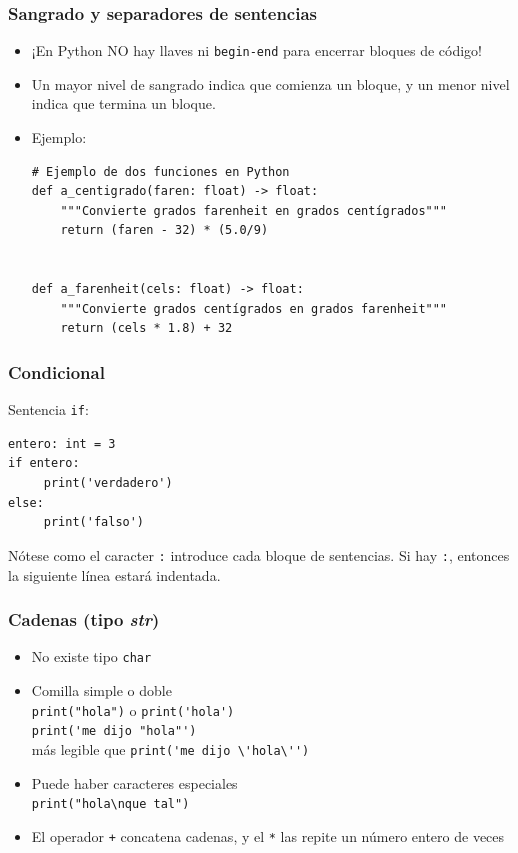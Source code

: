 \begin{frame}[fragile]
\frametitle{Sangrado y separadores de sentencias}

\begin{itemize}
\item ¡En Python NO hay llaves ni \verb|begin-end| para encerrar bloques
  de código!
\item Un mayor nivel de sangrado indica que comienza un bloque,
  y un menor nivel indica que termina un bloque.
  
\item Ejemplo:

  \begin{footnotesize}
\begin{verbatim}
# Ejemplo de dos funciones en Python
def a_centigrado(faren: float) -> float:
    """Convierte grados farenheit en grados centígrados"""
    return (faren - 32) * (5.0/9)


def a_farenheit(cels: float) -> float:
    """Convierte grados centígrados en grados farenheit"""
    return (cels * 1.8) + 32
\end{verbatim}
  \end{footnotesize}
\end{itemize}
\end{frame}




\begin{frame}[fragile]
\frametitle{Condicional}

Sentencia \verb|if|:

\begin{footnotesize}
\begin{verbatim}
entero: int = 3
if entero:
     print('verdadero')
else:
     print('falso')
\end{verbatim}
\end{footnotesize}
Nótese como el caracter \verb|:| introduce cada bloque de sentencias. Si hay \verb|:|, entonces la siguiente línea estará indentada.
\end{frame}



\begin{frame}[fragile]
\frametitle{Cadenas (tipo \emph{str})}

\begin{itemize}
\item No existe tipo \verb|char|
\item 
Comilla simple o doble \\
\verb|print("hola")|  o \verb|print('hola')|  \\
\verb|print('me dijo "hola"')| \\
más legible que \verb|print('me dijo \'hola\'')|
\item 
Puede haber caracteres especiales\\
\verb|print("hola\nque tal")|   

\item El operador \verb|+| concatena cadenas, y el \verb|*| las repite
  un número entero de veces
\end{itemize}
\end{frame}


